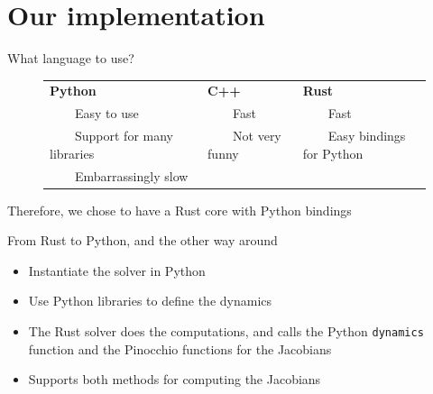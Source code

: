 \documentclass[aspectratio=169,draft]{beamer}
\newcommand{\tabitem}{~~\llap{\textbullet}~~}
\begin{document}
\section{Our implementation}
\begin{frame}{What language to use?}
    \begin{figure}
        \centering
        \renewcommand{\arraystretch}{1.4}
        \begin{tabular}{p{5cm}p{3.5cm}p{4.5cm}}
            \centering\textbf{Python}&\centering\textbf{C++}&\hspace{1.6cm}\textbf{Rust}\\
            \tabitem Easy to use&\tabitem Fast&\tabitem Fast\\
            \tabitem Support for many libraries&\tabitem Not very funny&\tabitem Easy bindings for Python\\
            \tabitem Embarrassingly slow&&
        \end{tabular}
    \end{figure}
    \vspace*{1cm}
    \centering
    Therefore, we chose to have a Rust core with Python bindings
\end{frame}

\begin{frame}{From Rust to Python, and the other way around}
    \begin{itemize}
        \item Instantiate the solver in Python
        \item Use Python libraries to define the dynamics
        \item The Rust solver does the computations, and calls the Python \texttt{dynamics} function and the Pinocchio functions for the Jacobians
        \item Supports both methods for computing the Jacobians
    \end{itemize}
\end{frame}
\end{document}
